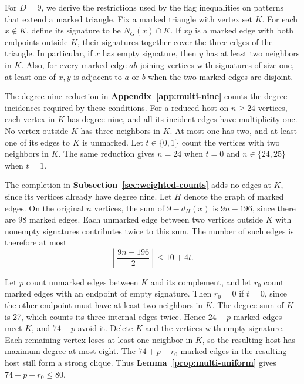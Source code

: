 \documentclass[preprint,11pt,numbers]{elsarticle-arxiv}
\numberwithin{equation}{section}
\theoremstyle{definition}
\begin{document}
For $D=9$, we derive the restrictions used by the flag inequalities
on patterns that extend a marked triangle. Fix a marked triangle
with vertex set $K$. For each $x\notin K$, define its signature to be
$N_G(x)\cap K$. If $xy$ is a marked edge with both endpoints outside
$K$, their signatures together cover the three edges of the
triangle. In particular, if $x$ has empty signature, then $y$ has
at least two neighbors in $K$. Also, for every marked edge $ab$
joining vertices with signatures of size one, at least one of
$x,y$ is adjacent to $a$ or $b$ when the two marked edges are
disjoint.

The degree-nine reduction in \textbf{Appendix~\ref{app:multi-nine}}
counts the degree incidences required by these conditions. For a
reduced host on $n\geq24$ vertices, each vertex in $K$ has degree
nine, and all its incident edges have multiplicity one. No vertex
outside $K$ has three neighbors in $K$. At most one has two, and
at least one of its edges to $K$ is unmarked. Let $t\in\{0,1\}$
count the vertices with two neighbors in $K$. The same reduction
gives $n=24$ when $t=0$ and $n\in\{24,25\}$ when $t=1$.

The completion in \textbf{Subsection~\ref{sec:weighted-counts}} adds
no edges at $K$, since its vertices already have degree nine.
Let $H$ denote the graph of marked edges. On the original $n$ vertices,
the sum of $9-d_H(x)$ is $9n-196$, since there are 98 marked edges.
Each unmarked edge between two vertices outside $K$ with nonempty
signatures contributes twice to this sum. The number of such
edges is therefore at most
\[
 \left\lfloor\frac{9n-196}{2}\right\rfloor\leq10+4t.
\]

Let $p$ count unmarked edges between $K$ and its complement,
and let $r_0$ count marked edges with an endpoint of empty
signature. Then $r_0=0$ if $t=0$, since the other endpoint
must have at least two neighbors in $K$. The degree sum of $K$
is 27, which counts its three internal edges twice. Hence
$24-p$ marked edges meet $K$, and $74+p$ avoid it. Delete $K$
and the vertices with empty signature. Each remaining vertex
loses at least one neighbor in $K$, so the resulting host has
maximum degree at most eight. The $74+p-r_0$ marked edges
in the resulting host still form a strong clique. Thus
\textbf{Lemma~\ref{prop:multi-uniform}} gives $74+p-r_0\leq80$.
\end{document}
